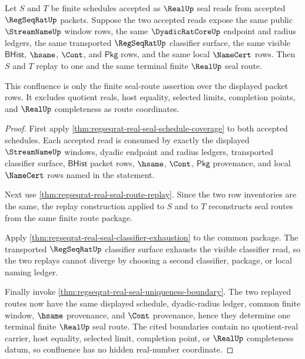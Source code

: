 \begin{theorem}
\label{thm:regseqrat-real-seal-schedule-confluence}
Let $S$ and $T$ be finite schedules accepted as $\RealUp$ seal reads from
accepted $\RegSeqRatUp$ packets. Suppose the two accepted reads expose the
same public $\StreamNameUp$ window rows, the same $\DyadicRatCoreUp$ endpoint
and radius ledgers, the same transported $\RegSeqRatUp$ classifier surface,
the same visible $\mathsf{BHist}$, $\hsame$, $\Cont$, and $\mathsf{Pkg}$ rows,
and the same local $\NameCert$ rows. Then $S$ and $T$ replay to one and the
same terminal finite $\RealUp$ seal route.

This confluence is only the finite seal-route assertion over the displayed
packet rows. It excludes quotient reals, host equality, selected limits,
completion points, and $\RealUp$ completeness as route coordinates.
\end{theorem}
\begin{proof}
First apply
\autoref{thm:regseqrat-real-seal-schedule-coverage} to both accepted
schedules. Each accepted read is consumed by exactly the displayed
$\StreamNameUp$ windows, dyadic endpoint and radius ledgers, transported
classifier surface, $\mathsf{BHist}$ packet rows, $\hsame$, $\Cont$,
$\mathsf{Pkg}$ provenance, and local $\NameCert$ rows named in the statement.

Next use \autoref{thm:regseqrat-real-seal-route-replay}. Since the two row
inventories are the same, the replay construction applied to $S$ and to $T$
reconstructs seal routes from the same finite route package.

Apply \autoref{thm:regseqrat-real-seal-classifier-exhaustion} to the common
package. The transported $\RegSeqRatUp$ classifier surface exhausts the
visible classifier read, so the two replays cannot diverge by choosing a
second classifier, package, or local naming ledger.

Finally invoke \autoref{thm:regseqrat-real-seal-uniqueness-boundary}. The two
replayed routes now have the same displayed schedule, dyadic-radius ledger,
common finite window, $\hsame$ provenance, and $\Cont$ provenance, hence they
determine one terminal finite $\RealUp$ seal route. The cited boundaries
contain no quotient-real carrier, host equality, selected limit, completion
point, or $\RealUp$ completeness datum, so confluence has no hidden
real-number coordinate.
\end{proof}

